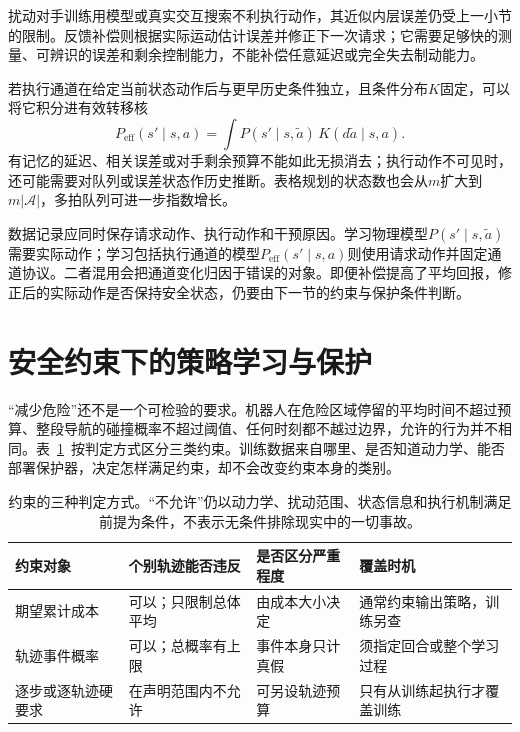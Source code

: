 扰动对手训练用模型或真实交互搜索不利执行动作，其近似内层误差仍受上一小节的限制。反馈补偿则根据实际运动估计误差并修正下一次请求；它需要足够快的测量、可辨识的误差和剩余控制能力，不能补偿任意延迟或完全失去制动能力。

若执行通道在给定当前状态动作后与更早历史条件独立，且条件分布$K$固定，可以将它积分进有效转移核
\[
  P_{\mathrm{eff}}(s'\mid s,a)
    =\int P(s'\mid s,\widetilde a)\,K(d\widetilde a\mid s,a).
\]
有记忆的延迟、相关误差或对手剩余预算不能如此无损消去；执行动作不可见时，还可能需要对队列或误差状态作历史推断。表格规划的状态数也会从$m$扩大到$m|\mathcal A|$，多拍队列可进一步指数增长。

数据记录应同时保存请求动作、执行动作和干预原因。学习物理模型$P(s'\mid s,\widetilde a)$需要实际动作；学习包括执行通道的模型$P_{\mathrm{eff}}(s'\mid s,a)$则使用请求动作并固定通道协议。二者混用会把通道变化归因于错误的对象。即便补偿提高了平均回报，修正后的实际动作是否保持安全状态，仍要由下一节的约束与保护条件判断。

\section{安全约束下的策略学习与保护}
\label{sec:rl-trustworthy-safety}

“减少危险”还不是一个可检验的要求。机器人在危险区域停留的平均时间不超过预算、整段导航的碰撞概率不超过阈值、任何时刻都不越过边界，允许的行为并不相同。表~\ref{tab:rl-trustworthy-constraint-types}~按判定方式区分三类约束。训练数据来自哪里、是否知道动力学、能否部署保护器，决定怎样满足约束，却不会改变约束本身的类别。

\begin{table}[htbp]
  \centering
  \begin{tabularx}{\linewidth}{@{}>{\raggedright\arraybackslash}p{22mm}XXX@{}}
    \toprule
    约束对象 & 个别轨迹能否违反 & 是否区分严重程度 & 覆盖时机 \\
    \midrule
    期望累计成本 & 可以；只限制总体平均 & 由成本大小决定 & 通常约束输出策略，训练另查 \\
    轨迹事件概率 & 可以；总概率有上限 & 事件本身只计真假 & 须指定回合或整个学习过程 \\
    逐步或逐轨迹硬要求 & 在声明范围内不允许 & 可另设轨迹预算 & 只有从训练起执行才覆盖训练 \\
    \bottomrule
  \end{tabularx}
  \caption{约束的三种判定方式。“不允许”仍以动力学、扰动范围、状态信息和执行机制满足前提为条件，不表示无条件排除现实中的一切事故。}
  \label{tab:rl-trustworthy-constraint-types}
\end{table}

